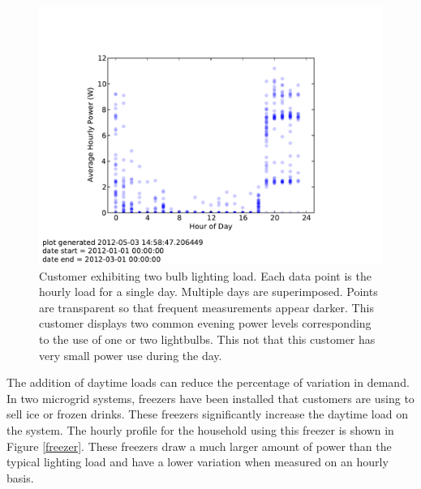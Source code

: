 \documentclass[conference]{IEEEtran}
\begin{document}
\begin{figure}[h]
\begin{center}
\includegraphics[trim = 0.7in 0.8in 0.7in 1.1in, clip, width=\columnwidth]
{figures/two_bulb_profile.pdf}
\end{center}
\caption{Customer exhibiting two bulb lighting load.
Each data point is the hourly load for a single day.
Multiple days are superimposed.
Points are transparent so that frequent measurements appear darker.
This customer displays two common evening power levels corresponding
to the use of one or two lightbulbs.
This not that this customer has very small power use during the day.}
\label{two-bulb-profile}
\end{figure}

The addition of daytime loads can reduce the percentage of variation
in demand.
In two microgrid systems, freezers have been installed that customers
are using to sell ice or frozen drinks.
These freezers significantly increase the daytime load on the system.
The hourly profile for the household using this freezer
is shown in Figure \ref{freezer}.
These freezers draw a much larger amount of power than the
typical lighting load and have a lower variation when measured
on an hourly basis.
\end{document}
